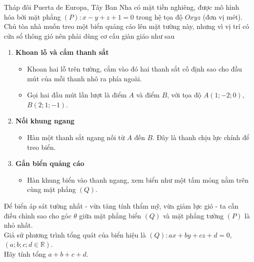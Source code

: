 \begin{bt}%
	Tháp đôi Puerta de Europa, Tây Ban Nha có mặt tiền nghiêng, được mô hình hóa bởi mặt phẳng $(P)\colon x-y+z+1=0$ trong hệ tọa độ $Oxyz$ (đơn vị mét). Chủ tòa nhà muốn treo một biển quảng cáo lên mặt  tường này, nhưng vì vị trí có cửa sổ thông gió nên phải dùng cơ cấu giàn giáo như sau
	\begin{enumerate}
		\item \textbf{Khoan  lỗ và cắm thanh sắt}
		\begin{itemize}
			\item Khoan hai lỗ trên tường, cắm vào đó hai thanh sắt cố định sao cho đầu mút của mỗi thanh  nhô ra phía ngoài.
			\item Gọi hai đầu mút lần lượt là điểm $A$ và điểm $B$, với tọa độ $A(1;-2;0)$, $B(2;1;-1)$. 
		\end{itemize}
		\item  \textbf{Nối khung ngang}
		\begin{itemize}
			\item Hàn một thanh sắt ngang nối từ $A$ đến $B$.  Đây là thanh chịu lực chính để treo biển.
		\end{itemize}
		 \item \textbf{Gắn biển quảng cáo}
		\begin{itemize}
			 \item Hàn khung biển vào thanh ngang, xem biển như một tấm mỏng nằm trên cùng mặt phẳng $(Q)$.
		\end{itemize}
	\end{enumerate}
	Để biển áp sát tường nhất - vừa tăng tính thẩm mỹ, vừa giảm lực gió - ta cần điều chỉnh sao cho góc $\theta$ giữa mặt phẳng biển $(Q)$ và mặt phẳng tường $(P)$  là nhỏ nhất.\\
	Giả sử phương trình tổng quát của biển  hiệu là $(Q)\colon ax+by+cz+d=0$, $(a;b;c;d \in \mathbb{R})$.\\
	Hãy tính  tổng $a+b+c+d$.
\end{bt}
